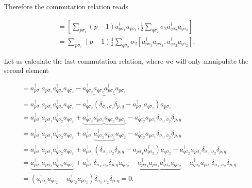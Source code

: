 \documentclass[aps,prl,groupedaddress]{revtex4-1}  %
\begin{document}
Therefore the commutation relation reads

\begin{align*}
[\hat{H}_0,\hat{S}_z]=[\sum_{p\sigma_1}(p-1)a^\dagger_{p\sigma_1}a_{p\sigma_1},\frac{1}{2}\sum_{q\sigma_2}\sigma_2 a^\dagger_{q\sigma_2}a_{q\sigma_2}]\\
=\sum_{p\sigma_1}(p-1)\frac{1}{2}\sum_{q\sigma_2}\sigma_2[a^\dagger_{p\sigma_1}a_{p\sigma_1}, a^\dagger_{q\sigma_2}a_{q\sigma_2}].
\end{align*}

Let us calculate the last commutation relation, where we will only manipulate the second element

\begin{align*}
[a^\dagger_{p\sigma_1}a_{p\sigma_1}, a^\dagger_{q\sigma_2}a_{q\sigma_2}] &= a^\dagger_{p\sigma_1} a_{p\sigma_1} a^\dagger_{q\sigma_2} a_{q\sigma_2}
-a^\dagger_{q\sigma_2}\underbrace{a_{q\sigma_2} a^\dagger_{p\sigma_1}}a_{p\sigma_1}\\
&=a^\dagger_{p\sigma_1}a_{p\sigma_1}a^\dagger_{q\sigma_2}a_{q\sigma_2}
-a^\dagger_{q\sigma_2}(\delta_{\sigma_1,\sigma_2}\delta_{p,q} - a^\dagger_{p\sigma_1} a_{q\sigma_2}) a_{p\sigma_1}\\
&=a^\dagger_{p\sigma_1} a_{p\sigma_1}a^\dagger_{q\sigma_2}a_{q\sigma_2}
+\underbrace{a^\dagger_{q\sigma_2} a^\dagger_{p\sigma_1}}\underbrace{a_{q\sigma_2} a_{p\sigma_1}}
-a^\dagger_{q\sigma_2} a_{p\sigma_1}\delta_{\sigma_1,\sigma_2}\delta_{p,q}\\
&=a^\dagger_{p\sigma_1} a_{p\sigma_1}a^\dagger_{q\sigma_2} a_{q\sigma_2}
+a^\dagger_{p\sigma_1} \underbrace{a^\dagger_{q\sigma_2} a_{p\sigma_1}} a_{q\sigma_2}
-a^\dagger_{q\sigma_2} a_{p\sigma_1}\delta_{\sigma_1,\sigma_2}\delta_{p,q}\\
&=a^\dagger_{p\sigma_1} a_{p\sigma_1}a^\dagger_{q\sigma_2} a_{q\sigma_2}
+a^\dagger_{p\sigma_1} (\delta_{\sigma_1,\sigma_2}\delta_{p,q} - a_{p\sigma_1} a^\dagger_{q\sigma_2}) a_{q\sigma_2}
-a^\dagger_{q\sigma_2} a_{p\sigma_1}\delta_{\sigma_1,\sigma_2}\delta_{p,q}\\
&=\underbrace{a^\dagger_{p\sigma_1} a_{p\sigma_1}a^\dagger_{q\sigma_2} a_{q\sigma_2}}
+a^\dagger_{p\sigma_1} \delta_{\sigma_1,\sigma_2}\delta_{p,q} a_{q\sigma_2}
-\underbrace{a^\dagger_{p\sigma_1} a_{p\sigma_1} a^\dagger_{q\sigma_2} a_{q\sigma_2}}
-a^\dagger_{q\sigma_2} a_{p\sigma_1}\delta_{\sigma_1,\sigma_2}\delta_{p,q}\\
&=(a^\dagger_{p\sigma_1} a_{q\sigma_2} -a^\dagger_{q\sigma_2} a_{p\sigma_1})\delta_{\sigma_1,\sigma_2}\delta_{p,q}=0.
\end{align*}
\end{document}
